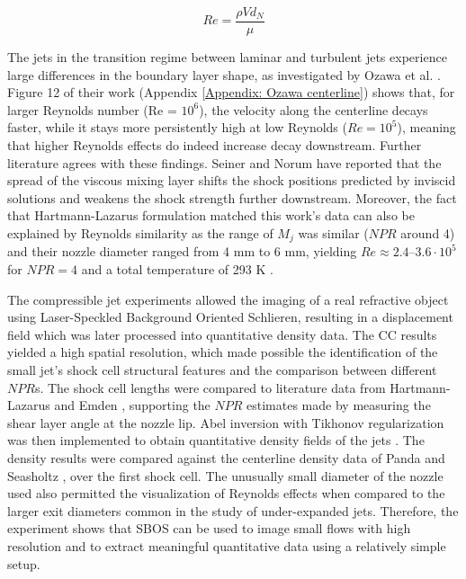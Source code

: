 \begin{equation}
    \label{equation: Reynolds Number}
    Re = \frac{\rho Vd_N}{\mu}
\end{equation}

The jets in the transition regime between laminar and turbulent jets experience large differences in the boundary layer shape, as investigated by Ozawa et al. \cite{Ozawa2020}. Figure 12 of their work (Appendix \ref{Appendix: Ozawa centerline}) shows that, for larger Reynolds number (Re = $10^6$), the velocity along the centerline decays faster, while it stays more persistently high at low Reynolds ($Re = 10^5$), meaning that higher Reynolds effects do indeed increase decay downstream. Further literature agrees with these findings. Seiner and Norum \cite{Seiner1980} have reported that the spread of the viscous mixing layer shifts the shock positions predicted by inviscid solutions and weakens the shock strength further downstream. Moreover, the fact that Hartmann-Lazarus formulation matched this work's data can also be explained by Reynolds similarity as the range of $M_j$ was similar ($NPR$ around 4) and their nozzle diameter ranged from 4 mm to 6 mm, yielding $Re \approx 2.4$--$3.6 \cdot 10^5$ for $NPR = 4$ and a total temperature of 293 K \cite{Hartmann1941}.

The compressible jet experiments allowed the imaging of a real refractive object using Laser-Speckled Background Oriented Schlieren, resulting in a displacement field which was later processed into quantitative density data. The CC results yielded a high spatial resolution, which made possible the identification of the small jet's shock cell structural features and the comparison between different $NPR$s. The shock cell lengths were compared to literature data from Hartmann-Lazarus and Emden \cite{Hartmann1941, Emden1899, Powell2010}, supporting the $NPR$ estimates made by measuring the shear layer angle at the nozzle lip. Abel inversion with Tikhonov regularization was then implemented to obtain quantitative density fields of the jets \cite{Abel1826,Dasch1992, Daun2006, Golub1979}. The density results were compared against the centerline density data of Panda and Seasholtz \cite{Panda1999}, over the first shock cell. The unusually small diameter of the nozzle used also permitted the visualization of Reynolds effects when compared to the larger exit diameters common in the study of under-expanded jets. Therefore, the experiment shows that SBOS can be used to image small flows with high resolution and to extract meaningful quantitative data using a relatively simple setup.

